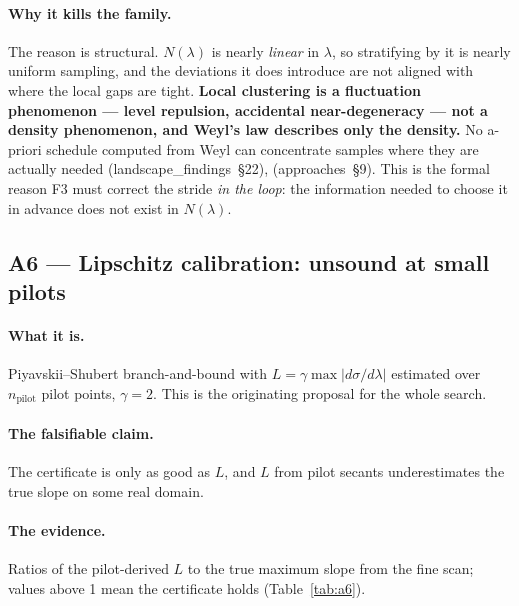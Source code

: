 \documentclass[11pt]{article}
\newcommand{\lf}[1]{(landscape\_findings~\S#1)}
\newcommand{\ap}[1]{(approaches~\S#1)}
\newcommand{\sig}{\sigma}
\newcommand{\lam}{\lambda}
\begin{document}
\paragraph{Why it kills the family.} The reason is structural. $N(\lam)$ is nearly \emph{linear}
in $\lam$, so stratifying by it is nearly uniform sampling, and the deviations it does introduce
are not aligned with where the local gaps are tight. \textbf{Local clustering is a fluctuation
phenomenon --- level repulsion, accidental near-degeneracy --- not a density phenomenon, and
Weyl's law describes only the density.} No a-priori schedule computed from Weyl can concentrate
samples where they are actually needed \lf{22}, \ap{9}. This is the formal reason F3 must correct
the stride \emph{in the loop}: the information needed to choose it in advance does not exist in
$N(\lam)$.

\subsection{A6 --- Lipschitz calibration: unsound at small pilots}

\paragraph{What it is.} Piyavskii--Shubert branch-and-bound with
$L = \gamma \max|d\sig/d\lam|$ estimated over $n_{\mathrm{pilot}}$ pilot points, $\gamma = 2$.
This is the originating proposal for the whole search.

\paragraph{The falsifiable claim.} The certificate is only as good as $L$, and $L$ from pilot
secants underestimates the true slope on some real domain.

\paragraph{The evidence.} Ratios of the pilot-derived $L$ to the true maximum slope from the fine
scan; values above 1 mean the certificate holds (Table~\ref{tab:a6}).
\end{document}
